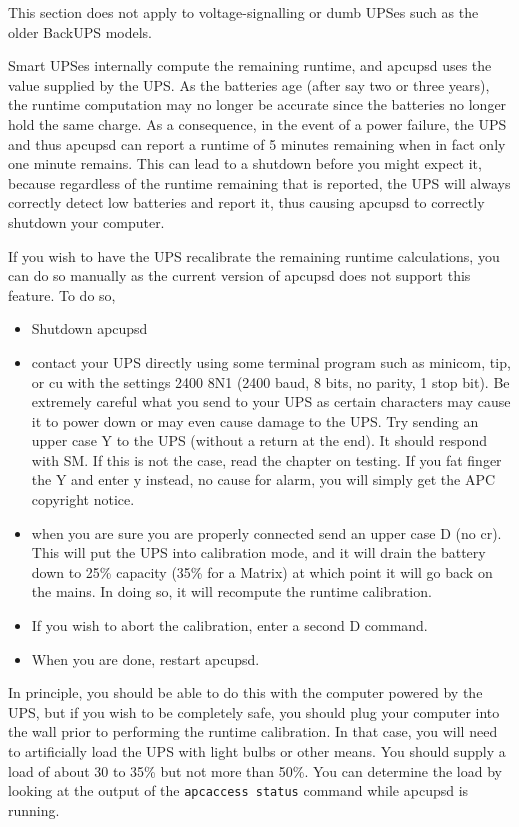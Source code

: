 {{{{{{{{{{This section does not apply to voltage-signalling or dumb UPSes such as the
older BackUPS models.  

Smart UPSes internally compute the remaining runtime, and apcupsd uses the
value supplied by the UPS. As the batteries age (after say two or three
years), the runtime computation may no longer be accurate since the batteries
no longer hold the same charge. As a consequence, in the event of a power
failure, the UPS and thus apcupsd can report a runtime of 5 minutes remaining
when in fact only one minute remains. This can lead to a shutdown before you
might expect it, because regardless of the runtime remaining that is reported,
the UPS will always correctly detect low batteries and report it, thus causing
apcupsd to correctly shutdown your computer.  

If you wish to have the UPS recalibrate the remaining runtime calculations,
you can do so manually as the current version of apcupsd does not support this
feature. To do so,  

\begin{itemize}
\item Shutdown apcupsd  
\item contact your UPS directly using some terminal program such as minicom,
   tip, or cu with the settings 2400 8N1 (2400 baud, 8 bits, no parity, 1 stop
   bit). Be extremely careful what you send to your UPS as certain characters may
cause it to power down or may even cause damage to the UPS. Try sending an
upper case Y to the UPS (without a return at the end). It should respond with
SM. If this is not the case, read the chapter on testing. If you fat finger
the Y and enter y instead, no cause for alarm, you will simply get the APC
copyright notice.  
\item when you are sure you are properly connected send an upper case D (no
   cr). This will put the UPS into calibration mode, and it will drain the
   battery down to 25\% capacity (35\% for a Matrix) at which point it will go
back on the mains. In doing so, it will recompute the runtime calibration.  
\item If you wish to abort the calibration, enter a second D command.  
\item When you are done, restart apcupsd. 
   \end{itemize}

In principle, you should be able to do this with the computer powered by the
UPS, but if you wish to be completely safe, you should plug your computer into
the wall prior to performing the runtime calibration. In that case, you will
need to artificially load the UPS with light bulbs or other means. You should
supply a load of about 30 to 35\% but not more than 50\%. You can determine
the load by looking at the output of the {\tt apcaccess status} command while
apcupsd is running.  

}}}}}}}}}}
